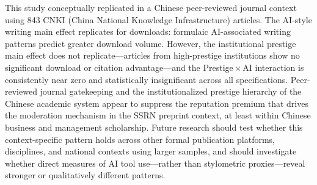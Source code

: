 \documentclass[12pt,a4paper]{article}
\begin{document}
This study conceptually replicated \citet{JoLi2026} in a Chinese
peer-reviewed journal context using 843 CNKI
(China National Knowledge Infrastructure) articles.
The AI-style writing main effect replicates for downloads: formulaic
AI-associated writing patterns predict greater download volume.
However, the institutional prestige main effect does not replicate---articles
from high-prestige institutions show no significant download or citation
advantage---and the Prestige\,$\times$\,AI interaction is consistently
near zero and statistically insignificant across all specifications.
Peer-reviewed journal gatekeeping and the institutionalized prestige
hierarchy of the Chinese academic system appear to suppress the
reputation premium that drives the moderation mechanism in the SSRN
preprint context, at least within Chinese business and management scholarship.
Future research should test whether this context-specific pattern holds
across other formal publication platforms, disciplines, and national
contexts using larger samples, and should investigate whether direct
measures of AI tool use---rather than stylometric proxies---reveal
stronger or qualitatively different patterns.
\end{document}
